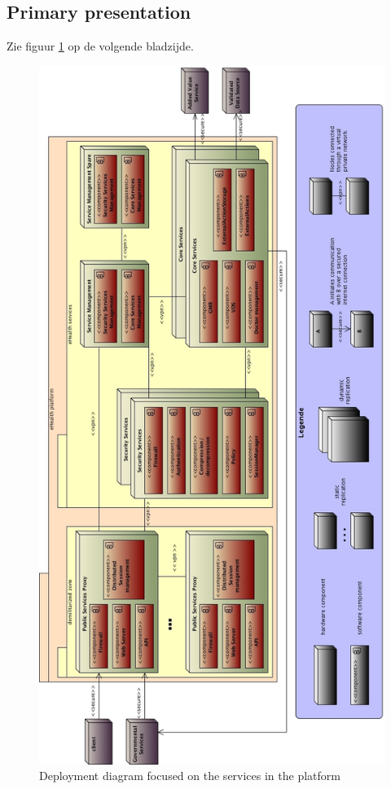 \documentclass[a4paper,10pt]{article}
\begin{document}
\subsection{Primary presentation}
Zie figuur \ref{fig:dep_services} op de volgende bladzijde.
\begin{center}
    \begin{figure}[!h]
      \includegraphics[scale=0.47]{../images/deployment_services.jpg}
	\caption{Deployment diagram focused on the services in the platform}
	\label{fig:dep_services}
    \end{figure}
  \end{center}
\end{document}
